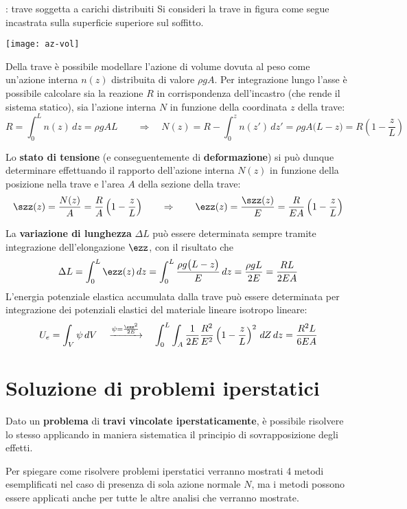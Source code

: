		\begin{esempio}{: trave soggetta a carichi distribuiti}
			Si consideri la trave in figura come segue incastrata sulla superficie superiore sul soffitto.
			\begin{center}
				\texttt{[image: az-vol]}
			\end{center}
			Della trave è possibile modellare l'azione di volume dovuta al peso come un'azione interna $n(z)$ distribuita di valore $\rho g A$. Per integrazione lungo l'asse è possibile calcolare sia la reazione $R$ in corrispondenza dell'incastro (che rende il sistema statico), sia l'azione interna $N$ in funzione della coordinata $z$ della trave:
			\[ R = \int_0^L n(z)\, dz = \rho g AL \qquad \Rightarrow \quad N(z) = R- \int_0^z n(z')\,dz' = \rho g A\big(L-z\big) = R \left(1 - \frac z L\right) \]
			
			Lo \textbf{stato di tensione} (e conseguentemente di \textbf{deformazione}) si può dunque determinare effettuando il rapporto dell'azione interna $N(z)$ in funzione della posizione nella trave e l'area $A$ della sezione della trave:
			\[ \szz(z) = \frac{N(z)}{A} = \frac RA\left(1- \frac z L\right)  \qquad \Rightarrow \qquad \ezz(z) = \frac{\szz(z)}{E} = \frac R{EA}\left(1- \frac z L\right) \]
			
			La \textbf{variazione di lunghezza} $\Delta L$ può essere determinata sempre tramite integrazione dell'elongazione $\ezz$, con il risultato che
			\[ \Delta L = \int_0^L \ezz(z)  \, dz = \int_0^L \frac{\rho g \big(L-z\big)}{E} \, dz = \frac{\rho gL}{2E} = \frac{RL}{2EA} \]
			L'energia potenziale elastica accumulata dalla trave può essere determinata per integrazione dei potenziali elastici del materiale lineare isotropo lineare:
			\[ U_e = \int_V \psi \, dV \quad \xrightarrow{\psi = \frac{\szz^2}{2E}}\quad \int_0^L \int_A \frac 1 {2E} \frac{R^2}{E^2} \left(1 - \frac z L\right)^2\, dZ\, dz = \frac{R^2L}{6EA} \]
		\end{esempio}

\section{Soluzione di problemi iperstatici}
	\begin{concetto}
		Dato un \textbf{problema} di \textbf{travi vincolate iperstaticamente}, è possibile risolvere lo stesso applicando in maniera sistematica il principio di sovrapposizione degli effetti.
	\end{concetto}
	Per spiegare come risolvere problemi iperstatici verranno mostrati 4 metodi esemplificati nel caso di presenza di sola azione normale $N$, ma i metodi possono essere applicati anche per tutte le altre analisi che verranno mostrate.
	
